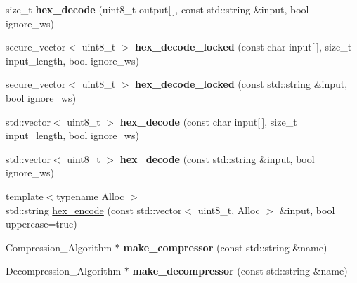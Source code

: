 \begin{DoxyCompactItemize}
\item 
\mbox{\label{namespace_botan_a285ac19269646074a6c40a54bde70c3e}} 
size\+\_\+t {\bfseries hex\+\_\+decode} (uint8\+\_\+t output\mbox{[}$\,$\mbox{]}, const std\+::string \&input, bool ignore\+\_\+ws)
\item 
\mbox{\label{namespace_botan_a4200b7862f58f433e8f9f1a1a3979e36}} 
secure\+\_\+vector$<$ uint8\+\_\+t $>$ {\bfseries hex\+\_\+decode\+\_\+locked} (const char input\mbox{[}$\,$\mbox{]}, size\+\_\+t input\+\_\+length, bool ignore\+\_\+ws)
\item 
\mbox{\label{namespace_botan_a426ca3673c2465a190f37e38b1fd6dfb}} 
secure\+\_\+vector$<$ uint8\+\_\+t $>$ {\bfseries hex\+\_\+decode\+\_\+locked} (const std\+::string \&input, bool ignore\+\_\+ws)
\item 
\mbox{\label{namespace_botan_a71fbf80da5e9135f06f8d365028cab7c}} 
std\+::vector$<$ uint8\+\_\+t $>$ {\bfseries hex\+\_\+decode} (const char input\mbox{[}$\,$\mbox{]}, size\+\_\+t input\+\_\+length, bool ignore\+\_\+ws)
\item 
\mbox{\label{namespace_botan_a3fbe2b31215abb865813b82afed3d5ab}} 
std\+::vector$<$ uint8\+\_\+t $>$ {\bfseries hex\+\_\+decode} (const std\+::string \&input, bool ignore\+\_\+ws)
\item 
{\footnotesize template$<$typename Alloc $>$ }\\std\+::string \mbox{\hyperlink{namespace_botan_a02a63d270351924b382780ee6d5b80c3}{hex\+\_\+encode}} (const std\+::vector$<$ uint8\+\_\+t, Alloc $>$ \&input, bool uppercase=true)
\item 
\mbox{\label{namespace_botan_afaf74fd3f39d9002f4ecdb5d0f4c298a}} 
Compression\+\_\+\+Algorithm $\ast$ {\bfseries make\+\_\+compressor} (const std\+::string \&name)
\item 
\mbox{\label{namespace_botan_a30aeec33fee5a682981b7881f226d7f4}} 
Decompression\+\_\+\+Algorithm $\ast$ {\bfseries make\+\_\+decompressor} (const std\+::string \&name)
\item 
\mbox{\label{namespace_botan_aba93d9533451120c2ccbf20d98e36174}} 

\end{DoxyCompactItemize}
